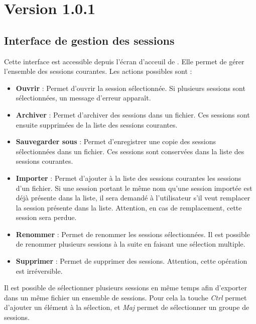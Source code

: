 


\maketitle

\section{Version 1.0.1}
\subsection{Interface de gestion des sessions}
Cette interface est accessible depuis l'écran d'acceuil de \tria. Elle permet de gérer l'ensemble des sessions courantes. Les actions possibles sont :\\
\begin{itemize}
\item \textbf{Ouvrir} : Permet d'ouvrir la session sélectionnée. Si plusieurs sessions sont sélectionnées, un message d'erreur apparaît.\\
\item \textbf{Archiver} : Permet d'archiver des sessions dans un fichier. Ces sessions sont ensuite supprimées de la liste des sessions courantes.\\
\item \textbf{Sauvegarder sous} : Permet d'enregistrer une copie des sessions sélectionnées dans un fichier. Ces sessions sont conservées dans la liste des sessions courantes.\\
\item \textbf{Importer} : Permet d'ajouter à la liste des sessions courantes les sessions d'un fichier. Si une session portant le même nom qu'une session importée est déjà présente dans la liste, il sera demandé à l'utilisateur s'il veut remplacer la session présente dans la liste. Attention, en cas de remplacement, cette session sera perdue.\\
\item \textbf{Renommer} : Permet de renommer les sessions sélectionnées. Il est possible de renommer plusieurs sessions à la suite en faisant une sélection multiple.\\
\item \textbf{Supprimer} : Permet de supprimer des sessions. Attention, cette opération est irréversible.\\
\end{itemize}

Il est possible de sélectionner plusieurs sessions en même temps afin d'exporter dans un même fichier un ensemble de sessions. Pour cela la touche \textit{Ctrl} permet d'ajouter un élément à la sélection, et \textit{Maj} permet de sélectionner un groupe de sessions.\\

